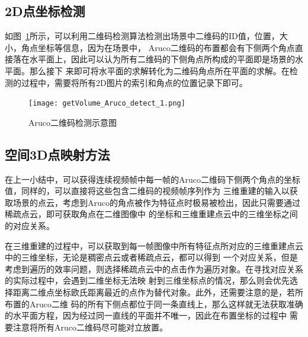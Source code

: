 \subsection{2D点坐标检测}
\label{sec:4.2.1}
如图~\ref{fig:getVolume_Aruco_detect}所示，可以利用二维码检测算法检测出场景中二维码的ID值，位置，大小，角点坐标等信息，因为在场景中，
Aruco二维码的布置都会有下侧两个角点直接落在水平面上，因此可以认为所有二维码的下侧角点所构成的平面即是场景的水平面。那么接下
来即可将水平面的求解转化为二维码角点所在平面的求解。在检测的过程中，需要将所有2D图片的索引和角点的位置记录下即可。

\begin{figure}[H] %
\centering
\texttt{[image: getVolume\_Aruco\_detect\_1.png]}
\caption{Aruco二维码检测示意图}
\label{fig:getVolume_Aruco_detect}
\end{figure}

\subsection{空间3D点映射方法}
\label{sec:4.2.2}
在上一小结中，可以获得连续视频帧中每一帧的Aruco二维码下侧两个角点的坐标值，同样的，可以直接将这些包含二维码的视频帧序列作为
三维重建的输入以获取场景的点云，考虑到Aruco的角点被作为特征点时极易被检出，因此只需要通过稀疏点云，即可获取角点在二维图像中
的坐标和三维重建点云中的三维坐标之间的对应关系。

在三维重建的过程中，可以获取到每一帧图像中所有特征点所对应的三维重建点云中的三维坐标，无论是稠密点云或者稀疏点云，都可以得到
一个对应关系，但是考虑到遍历的效率问题，则选择稀疏点云中的点击作为遍历对象。在寻找对应关系的实际过程中，会遇到二维坐标无法映
射到三维坐标点的情况，那么则会优先选择距离二维点坐标欧氏距离最近的点作为替代对象。此外，还需要注意的是，若所布置的Aruco二维
码的所有下侧点都位于同一条直线上，那么这样就无法获取准确的水平面方程，因为经过同一直线的平面并不唯一，因此在布置坐标的过程中
需要注意将所有Aruco二维码尽可能对立放置。
